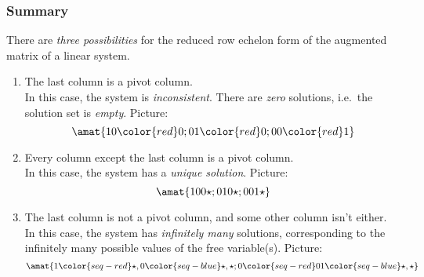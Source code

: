 \begin{frame}
\frametitle{Summary}

There are \emph{three possibilities} for the reduced row echelon form of the
augmented matrix of a linear system.\pause

\begin{enumerate}
\item \alert{The last column is a pivot column.}\\
  In this case, the system is \emph{inconsistent}.  
  \pause
  There are \emph{zero} solutions, i.e.\ the solution set is \emph{empty}.  
  Picture:
  \pause
  \[ \amat{ 1 0 {\color{red}0}; 0 1 {\color{red}0}; 0 0 {\color{red}1}} \]

\pause
\item \alert{Every column except the last column is a pivot column.}\\
  In this case, the system has a \emph{unique solution}.  Picture:
  \[ \amat{
      1  0  0  \star ;
      0  1  0  \star ;
      0  0  1  \star
    } \]

\pause
\item \alert{The last column is not a pivot column, and some other column isn't either.}\\
  In this case, the system has \emph{infinitely many} solutions, corresponding
  to the infinitely many possible values of the free variable(s).  Picture:
  \[\amat{
      1  \color{seq-red}\star,  0  \color{seq-blue}\star,  \star ;
      0  \color{seq-red}0   1  \color{seq-blue}\star, \star
    }\]

\end{enumerate}

\end{frame}


